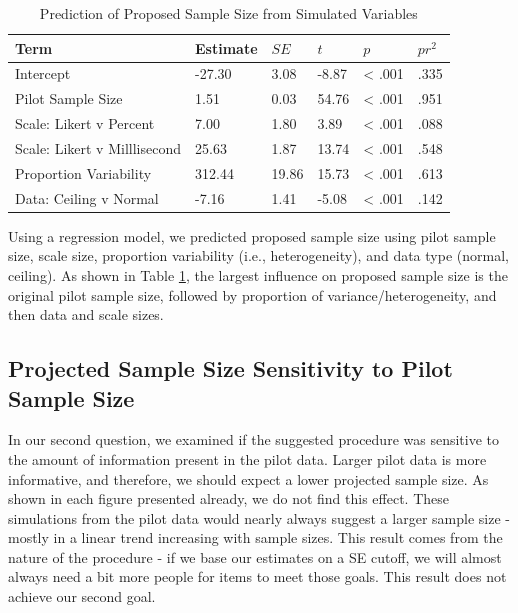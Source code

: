 \documentclass[
  man]{apa7}
\begin{document}
\begin{table}[tbp]

\begin{center}
\begin{threeparttable}

\caption{\label{tab:table-predict-largest}Prediction of Proposed Sample Size from Simulated Variables}

\begin{tabular}{llllll}
\toprule
Term & Estimate & $SE$ & $t$ & $p$ & $pr^2$\\
\midrule
Intercept & -27.30 & 3.08 & -8.87 & < .001 & .335\\
Pilot Sample Size & 1.51 & 0.03 & 54.76 & < .001 & .951\\
Scale: Likert v Percent & 7.00 & 1.80 & 3.89 & < .001 & .088\\
Scale: Likert v Milllisecond & 25.63 & 1.87 & 13.74 & < .001 & .548\\
Proportion Variability & 312.44 & 19.86 & 15.73 & < .001 & .613\\
Data: Ceiling v Normal & -7.16 & 1.41 & -5.08 & < .001 & .142\\
\bottomrule
\end{tabular}

\end{threeparttable}
\end{center}

\end{table}

Using a regression model, we predicted proposed sample size using pilot sample size, scale size, proportion variability (i.e., heterogeneity), and data type (normal, ceiling). As shown in Table \ref{tab:table-predict-largest}, the largest influence on proposed sample size is the original pilot sample size, followed by proportion of variance/heterogeneity, and then data and scale sizes.

\hypertarget{projected-sample-size-sensitivity-to-pilot-sample-size}{%
\subsection{Projected Sample Size Sensitivity to Pilot Sample Size}\label{projected-sample-size-sensitivity-to-pilot-sample-size}}

In our second question, we examined if the suggested procedure was sensitive to the amount of information present in the pilot data. Larger pilot data is more informative, and therefore, we should expect a lower projected sample size. As shown in each figure presented already, we do not find this effect. These simulations from the pilot data would nearly always suggest a larger sample size - mostly in a linear trend increasing with sample sizes. This result comes from the nature of the procedure - if we base our estimates on a SE cutoff, we will almost always need a bit more people for items to meet those goals. This result does not achieve our second goal.
\end{document}
